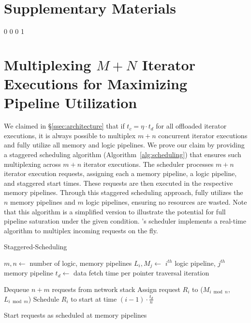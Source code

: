 \section*{Supplementary Materials}

\vspace{15pt}
\renewcommand\thesection{\Alph{section}.}
\renewcommand\thesubsection{\Alph{section}.\arabic{subsection}}
\setcounter {subfigure} {0}
\setcounter {figure} {0}
\setcounter {section} {0}
\setcounter {page} {1}

\section{Multiplexing $M+N$ Iterator Executions for Maximizing Pipeline Utilization}

We claimed in \S\ref{ssec:architecture} that if $t_c = \eta \cdot t_d$ for all offloaded iterator executions, it is always possible to multiplex $m + n$ concurrent iterator executions and fully utilize all memory and logic pipelines. We prove our claim by providing a staggered scheduling algorithm (Algorithm~\ref{alg:scheduling}) that ensures such multiplexing across $m+n$ iterator executions. The scheduler processes $m+n$ iterator execution requests, assigning each a memory pipeline, a logic pipeline, and staggered start times. These requests are then executed in the respective memory pipelines. Through this staggered scheduling approach, \name fully utilizes the $n$ memory pipelines and $m$ logic pipelines, ensuring no resources are wasted. Note that this algorithm is a simplified version to illustrate the potential for full pipeline saturation under the given condition. \name's scheduler implements a real-time algorithm to multiplex incoming requests on the fly.


\begin{algorithm}
\caption{Staggered-Scheduling}
\label{alg:scheduling}
\begin{algorithmic}[1]
\State $m, n \gets$ number of logic, memory pipelines
\State $L_i, M_j \gets$ $i^{th}$ logic pipeline, $j^{th}$ memory pipeline
\State $t_d \gets$ data fetch time per pointer traversal iteration

    \State Dequeue $n + m$ requests from network stack
        \State Assign request $R_i$ to ($M_{i \bmod n}$,  $L_{i \bmod m}$)
        \State Schedule $R_i$ to start at time $(i-1) \cdot \frac{t_d}{n}$
        
        
    \EndFor
    
    \State Start requests as scheduled at memory pipelines
    
\EndWhile
\end{algorithmic}
\end{algorithm}


